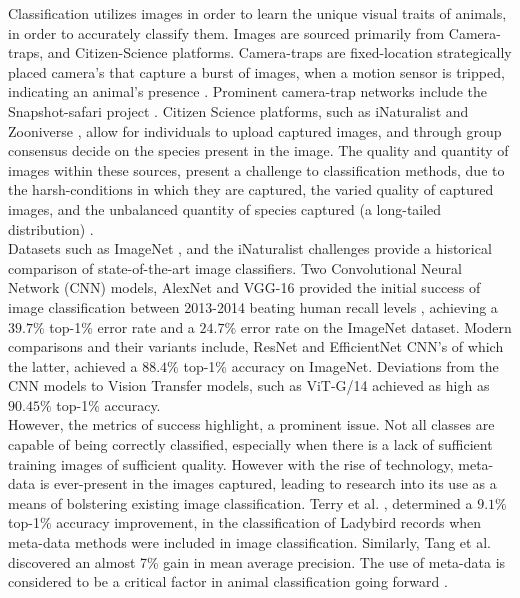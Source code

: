 \documentclass[conference]{IEEEtran}
\begin{document}
    Classification utilizes images in order to learn the unique visual traits of animals, in order to accurately classify them. Images are sourced primarily from Camera-traps, and Citizen-Science platforms. Camera-traps are fixed-location strategically placed camera's that capture a burst of images, when a motion sensor is tripped, indicating an animal's presence \cite{Schneider_Greenberg_Taylor_Kremer_2020}. Prominent camera-trap networks include the Snapshot-safari project \cite{snapshot_safari}. Citizen Science platforms, such as iNaturalist \cite{iNaturalist} and Zooniverse \cite{zooniverse.org}, allow for individuals to upload captured images, and through group consensus decide on the species present in the image. 
    The quality and quantity of images within these sources, present a challenge to classification methods, due to the harsh-conditions in which they are captured, the varied quality of captured images, and the unbalanced quantity of species captured (a long-tailed distribution) \cite{Van_Horn_Mac_Aodha_Song_Cui_Sun_Shepard_Adam_Perona_Belongie_2018b}. 
    \\

    Datasets such as ImageNet \cite{ImageNet}, and the iNaturalist challenges \cite{Van_Horn_Mac_Aodha_Song_Cui_Sun_Shepard_Adam_Perona_Belongie_2018b} provide a historical comparison of state-of-the-art image classifiers. Two Convolutional Neural Network (CNN) models, AlexNet \cite{Krizhevsky_Sutskever_Hinton_2017a} and VGG-16 \cite{Simonyan2014-ww} provided the initial success of image classification between 2013-2014 beating human recall levels \cite{Wäldchen_Mäder_2018}, achieving a $39.7\%$ top-1\% error rate and a $24.7\%$ error rate on the ImageNet dataset. Modern comparisons and their variants include, ResNet \cite{He_Zhang_Ren_Sun_2016} and EfficientNet \cite{Tan2019} CNN's of which the latter, achieved a $88.4\%$ top-1\% accuracy on ImageNet. Deviations from the CNN models to Vision Transfer models, such as ViT-G/14 \cite{Zhai_Kolesnikov_Houlsby_Beyer_2022} achieved as high as $90.45\%$ top-1\% accuracy.
    \\ 

    However, the metrics of success highlight, a prominent issue. Not all classes are capable of being correctly classified, especially when there is a lack of sufficient training images of sufficient quality. However with the rise of technology, meta-data is ever-present in the images captured, leading to research into its use as a means of bolstering existing image classification. 
    Terry et al. \cite{Terry_Roy_August_2019}, determined a $9.1\%$ top-1\% accuracy improvement, in the classification of Ladybird records when meta-data methods were included in image classification. Similarly, Tang et al. \cite{tang_paluri_fei-fei_fergus_bourdev_2015} discovered an almost 7\% gain in mean average precision. The use of meta-data is considered to be a critical factor in animal classification going forward \cite{Wäldchen_Mäder_2018}. 
    \\
\end{document}
